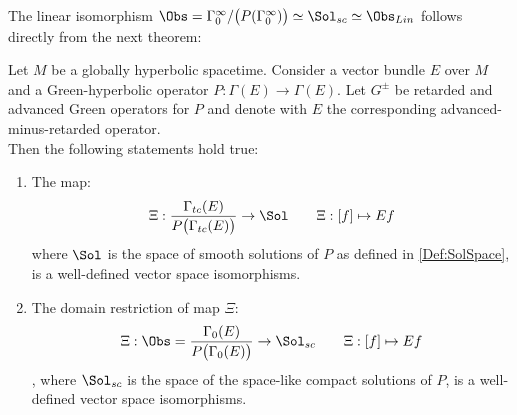 \documentclass[Main]{subfiles}
\begin{document}
	The linear isomorphism $\Obs = \Gamma_0^\infty / \big( P ( \Gamma_0^\infty) \big) \simeq \Sol_{sc} \simeq \Obs_{Lin}$ follows directly from the next theorem:
	\begin{theorem}\label{Teo:IsomorphismBetweenTheTwoSymplectic}
					Let $M$ be a globally hyperbolic spacetime. Consider a vector bundle $E$ over $M$ and a Green-hyperbolic operator $P: \Gamma(E)\rightarrow \Gamma(E)$.
				Let $G^\pm$ be retarded and advanced Green operators for $P$ and denote with $E$ the corresponding advanced-minus-retarded operator.\\
				Then the following statements hold true:
					\begin{enumerate}
						\item The map:
							\begin{equation}
								 \Xi : \frac{\Gamma_{tc}(E)}{P \big( \Gamma_{tc}(E)\big)} \rightarrow  \Sol \qquad \Xi: [f] \mapsto E f
							\end{equation}
							where $\Sol$ is the space of smooth solutions of $P$ as defined in \ref{Def:SolSpace},
							is a well-defined vector space isomorphisms.
						\item The domain restriction of map $\Xi$:
							\begin{equation}
								 \Xi : \Obs= \frac{\Gamma_{0}(E)}{P \big( \Gamma_{0}(E)\big)} \rightarrow  \Sol_{sc} \qquad \Xi: [f] \mapsto E f
							\end{equation}
							, where $\Sol_{sc}$ is the space of the space-like compact solutions of $P$,
							is a well-defined vector space isomorphisms.
					\end{enumerate}
	\end{theorem}
\ifToninus
\end{document}
